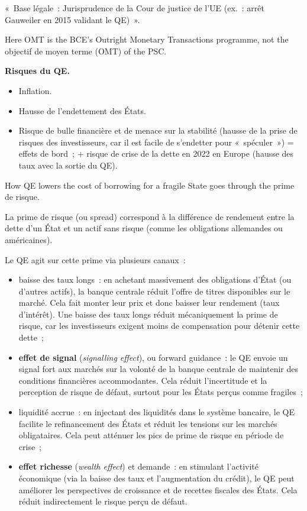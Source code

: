 \begin{remark}
  «~Base légale~: Jurisprudence de la Cour de justice de l'UE (ex.~: arrêt Gauweiler en
  2015 validant le QE)~».
\end{remark}

\begin{notation}
  Here OMT is the BCE's Outright Monetary Transactions programme, not the objectif de
  moyen terme (OMT) of the PSC.
\end{notation}

\textbf{Risques du QE.}
\begin{itemize}
  \item Inflation.
  \item Hausse de l'endettement des États.
  \item Risque de bulle financière et de menace sur la stabilité (hausse de la prise de
    risques des investisseurs, car il est facile de s'endetter pour «~spéculer~») =
    effets de bord~; + risque de crise de la dette en 2022 en Europe (hausse des taux
    avec la sortie du QE).
\end{itemize}

How QE lowers the cost of borrowing for a fragile State goes through the prime de
risque.

\begin{definition}
  La prime de risque (ou spread) correspond à la différence de rendement entre la dette
  d'un État et un actif sans risque (comme les obligations allemandes ou américaines).
\end{definition}

Le QE agit sur cette prime via plusieurs canaux~:
\begin{itemize}
  \item baisse des taux longs~: en achetant massivement des obligations d'État (ou
    d'autres actifs), la banque centrale réduit l'offre de titres disponibles sur le
    marché. Cela fait monter leur prix et donc baisser leur rendement (taux d'intérêt).
    Une baisse des taux longs réduit mécaniquement la prime de risque, car les
    investisseurs exigent moins de compensation pour détenir cette dette~;
  \item \textbf{effet de signal} (\textit{signalling effect}), ou forward guidance~: le
    QE envoie un signal fort aux marchés sur la volonté de la banque centrale de
    maintenir des conditions financières accommodantes. Cela réduit l'incertitude et la
    perception de risque de défaut, surtout pour les États perçus comme fragiles~;
  \item liquidité accrue~: en injectant des liquidités dans le système bancaire, le QE
    facilite le refinancement des États et réduit les tensions sur les marchés
    obligataires. Cela peut atténuer les pics de prime de risque en période de crise~;
  \item \textbf{effet richesse} (\textit{wealth effect}) et demande~: en stimulant
    l'activité économique (via la baisse des taux et l'augmentation du crédit), le QE
    peut améliorer les perspectives de croissance et de recettes fiscales des États.
    Cela réduit indirectement le risque perçu de défaut.
\end{itemize}

